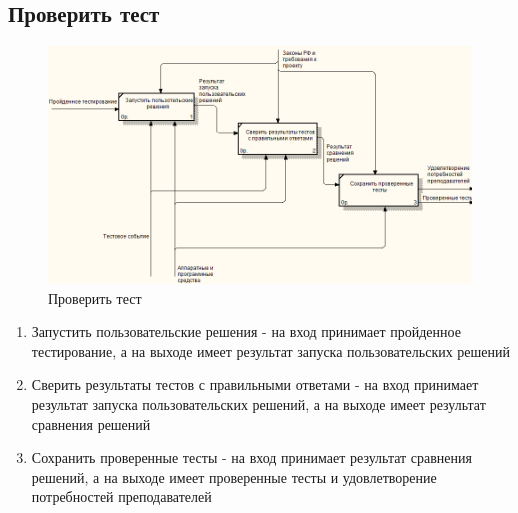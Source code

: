     \subsection{Проверить тест}
    \begin{figure}[H]
        \includegraphics[width=\textwidth, center]{../img/idef0/ValidateTestDecompose.png}
        \caption{Проверить тест}
    \end{figure}

    \begin{enumerate}
        \item Запустить пользовательские решения - на вход принимает пройденное тестирование,
        а на выходе имеет результат запуска пользовательских решений
        \item Сверить результаты тестов с правильными ответами - на вход принимает 
        результат запуска пользовательских решений, а на выходе имеет результат сравнения 
        решений
        \item Сохранить проверенные тесты - на вход принимает результат сравнения
        решений, а на выходе имеет проверенные тесты и удовлетворение потребностей
        преподавателей
    \end{enumerate}

